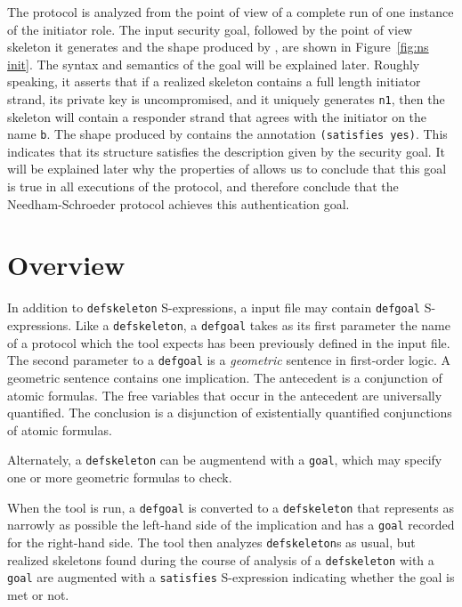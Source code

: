 The protocol is analyzed from the point of view of a complete run of
one instance of the initiator role.  The input security goal, followed
by the point of view skeleton it generates and the shape produced by
{\cpsa}, are shown in Figure~\ref{fig:ns init}.  The syntax and
semantics of the goal will be explained later.  Roughly speaking, it
asserts that if a realized skeleton contains a full length initiator
strand, its private key is uncompromised, and it uniquely generates
\texttt{n1}, then the skeleton will contain a responder strand that
agrees with the initiator on the name \texttt{b}.  The shape produced
by {\cpsa} contains the annotation \texttt{(satisfies yes)}.  This
indicates that its structure satisfies the description given by the
security goal.  It will be explained later why the properties of
{\cpsa} allows us to conclude that this goal is true in all executions
of the protocol, and therefore conclude that the Needham-Schroeder
protocol achieves this authentication goal.

\section{Overview}\label{sec:goalsoverview}

In addition to \texttt{defskeleton} S-expressions, a {\cpsa} input
file may contain \texttt{defgoal} S-expressions.  Like a
\texttt{defskeleton}, a \texttt{defgoal} takes as its first parameter
the name of a protocol which the tool expects has been previously
defined in the input file.  The second parameter to a \texttt{defgoal}
is a \emph{geometric} sentence in first-order logic.  A geometric
sentence contains one implication.  The antecedent is a conjunction
of atomic formulas.  The free variables that occur in the antecedent
are universally quantified.  The conclusion is a disjunction of
existentially quantified conjunctions of atomic formulas.

Alternately, a \texttt{defskeleton} can be augmentend with a
\texttt{goal}, which may specify one or more geometric
formulas to check.

When the tool is run, a \texttt{defgoal} is converted to a
\texttt{defskeleton} that represents as narrowly as possible the
left-hand side of the implication and has a \texttt{goal} recorded for
the right-hand side.  The tool then analyzes \texttt{defskeleton}s as
usual, but realized skeletons found during the course of analysis of a
\texttt{defskeleton} with a \texttt{goal} are augmented with
a \texttt{satisfies} S-expression indicating whether the goal is met or
not.

